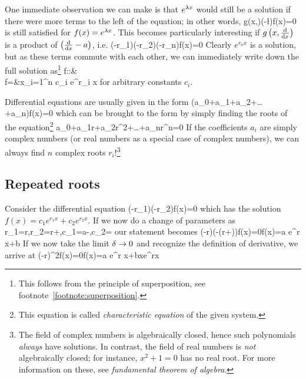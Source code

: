 One immediate observation we can make is that $e^{\lambda x}$ would still be a solution if there were more terms to the left of the equation; in other words,
\be 
g\left(x,\right)\left(-\l\right)f(x)=0
\ee 
is still satisfied for $f(x)=e^{\lambda x}$. This becomes particularly interesting if $g\left(x,\frac{\dd }{\dd x}\right)$ is a product of $\left(\frac{\dd }{\dd x}-a\right)$, i.e.
\be
\label{eq: product form diff eqn} 
\left(-r_1\right)\left(-r_2\right)\cdots\left(-r_n\right)f(x)=0
\ee 
Clearly $e^{r_nx}$ is a solution, but as these terms commute with each other, we can immediately write down the full solution as\footnote{This follows from the principle of superposition, see footnote~\ref{footnote:superposition}.}
\bea 
f::{}&{}\C\to\C\\
f={}&{}x\to \sum\limits_{i=1}^n c_i e^{r_i x}
\eea
for arbitrary constants $c_i$.

Differential equations are usually given in the form
\be 
\left(a_0+a_1+a_2+\dots+a_n\right)f(x)=0
\ee 
which can be brought to the form  by simply finding the roots of the equation\footnote{This equation is called \emph{characteristic equation} of the given system.}
\be 
a_0+a_1r+a_2r^2+\dots+a_nr^n=0
\ee 
If the coefficients $a_i$ are simply complex numbers (or real numbers as a special case of complex numbers), we can always find $n$ complex roots $r_i$!\footnote{
	The field of complex numbers is algebraically closed, hence such polynomials \emph{always} have solutions. In contrast, the field of real numbers is \emph{not} algebraically closed; for instance, $x^2+1=0$ has no real root. For more information on these, see \emph{fundamental theorem of algebra}.
}

\subsection{Repeated roots}
Consider the differential equation
\be
\left(-r_1\right)\left(-r_2\right)f(x)=0
\ee 
which has the solution $f(x)=c_1 e^{r_1x}+c_2e^{r_2x}$. If we now do a change of parameters as
\be 
\label{eq: repeated root transformation}
r_1=r\;,\quad r_2=r+\de\;,\quad c_1=a-\;,\quad c_2=
\ee 
our statement becomes
\be 
\left(-r\right)\left(-(r+\de)\right)f(x)=0\quad f(x)=a e^{r x}+b
\ee 
If we now take the limit $\delta\to 0$ and recognize the definition of derivative, we arrive at
\be 
\label{eq: repeated result}
\left(-r\right)^2f(x)=0\quad\rightarrow\quad f(x)=a e^{r x}+bxe^{rx}
\ee 

